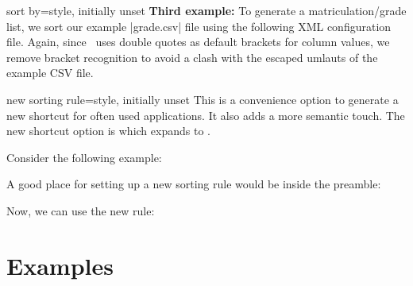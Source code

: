 \documentclass[a4paper,11pt]{ltxdoc}
\begin{document}
\begin{docCsvKey}{sort by}{=}{style, initially unset}
\clearpage\textbf{Third example:}
  To generate a matriculation/grade list, we sort our example |grade.csv| file
  using the following XML configuration file.
  Again, since \csvsorter\ uses double quotes
  as default brackets for column values, we remove bracket recognition to avoid
  a clash with the escaped umlauts of the example CSV file.\par\smallskip

\begin{dispExample}
\end{dispExample}
\end{docCsvKey}


\clearpage
\begin{docCsvKey}{new sorting rule}{=}{style, initially unset}
This is a convenience option to generate a new shortcut for often used
 applications. It also adds a more semantic touch.
The new shortcut option is
 which expands to
.\par\medskip

Consider the following example:
\begin{dispExample}
\end{dispExample}
A good place for setting up a new sorting rule would be inside the preamble:

\begin{dispListing}
\end{dispListing}

Now, we can use the new rule:
\begin{dispExample}
\end{dispExample}

\end{docCsvKey}



\clearpage
\section{Examples}%
\end{document}
